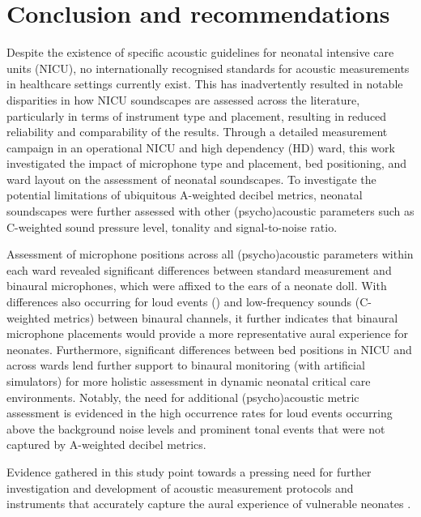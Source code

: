 \section{Conclusion and recommendations}

Despite the existence of specific acoustic guidelines for neonatal intensive care units (NICU), no internationally recognised standards for acoustic measurements in healthcare settings currently exist. This has inadvertently resulted in notable disparities in how NICU soundscapes are assessed across the literature, particularly in terms of instrument type and placement, resulting in reduced reliability and comparability of the results. Through a detailed measurement campaign in an operational NICU and high dependency (HD) ward, this work investigated the impact of microphone type and placement, bed positioning, and ward layout on the assessment of neonatal soundscapes. To investigate the potential limitations of ubiquitous A-weighted decibel metrics, neonatal soundscapes were further assessed with other (psycho)acoustic parameters such as C-weighted sound pressure level, tonality and signal-to-noise ratio.

Assessment of microphone positions across all (psycho)acoustic parameters within each ward revealed significant differences between standard measurement and binaural microphones, which were affixed to the ears of a neonate doll. With differences also occurring for loud events () and low-frequency sounds (C-weighted metrics) between binaural channels, it further indicates that binaural microphone placements would provide a more representative aural experience for neonates. Furthermore, significant differences between bed positions in NICU and across wards lend further support to binaural monitoring (with artificial simulators) for more holistic assessment in dynamic neonatal critical care environments. Notably, the need for additional (psycho)acoustic metric assessment is evidenced in the high occurrence rates for loud events occurring  above the background noise levels and prominent tonal events that were not captured by A-weighted decibel metrics.

Evidence gathered in this study point towards a pressing need for further investigation and development of  acoustic measurement protocols and instruments that accurately capture the aural experience of vulnerable neonates .

